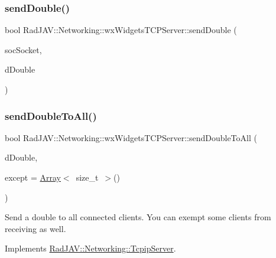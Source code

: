 \subsubsection{\texorpdfstring{send\+Double()}{sendDouble()}}
{\footnotesize\ttfamily bool Rad\+J\+A\+V\+::\+Networking\+::wx\+Widgets\+T\+C\+P\+Server\+::send\+Double (\begin{DoxyParamCaption}\item[{wx\+Socket\+Base $\ast$}]{soc\+Socket,  }\item[{double}]{d\+Double }\end{DoxyParamCaption})}

\mbox{\label{class_rad_j_a_v_1_1_networking_1_1wx_widgets_t_c_p_server_a24e90f9fd8da7f16c365f4e3ae00c565}} 
\subsubsection{\texorpdfstring{send\+Double\+To\+All()}{sendDoubleToAll()}}
{\footnotesize\ttfamily bool Rad\+J\+A\+V\+::\+Networking\+::wx\+Widgets\+T\+C\+P\+Server\+::send\+Double\+To\+All (\begin{DoxyParamCaption}\item[{double}]{d\+Double,  }\item[{\mbox{\hyperlink{class_rad_j_a_v_1_1_array}{Array}}$<$ size\+\_\+t $>$}]{except = {\ttfamily \mbox{\hyperlink{class_rad_j_a_v_1_1_array}{Array}}$<$~size\+\_\+t~$>$()} }\end{DoxyParamCaption})\hspace{0.3cm}{\ttfamily [virtual]}}

Send a double to all connected clients. You can exempt some clients from receiving as well. 

Implements \mbox{\hyperlink{class_rad_j_a_v_1_1_networking_1_1_tcpip_server_a77ef40e188197fd44d7deb4d106c8b72}{Rad\+J\+A\+V\+::\+Networking\+::\+Tcpip\+Server}}.

\mbox{\label{class_rad_j_a_v_1_1_networking_1_1wx_widgets_t_c_p_server_a2c0f9bf6466f22c44cba8921b2086d4a}} 
